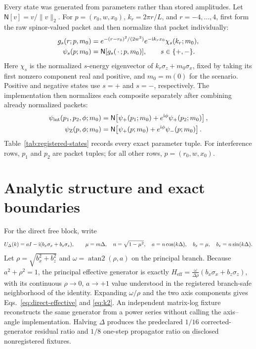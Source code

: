 Every state was generated from parameters rather than stored amplitudes.  Let
$\mathsf N[v]=v/\lVert v\rVert_2$.  For $p=(r_0,w,x_0)$,
$k_r=2\pi r/L$, and $r=-4,\ldots,4$, first form the raw spinor-valued packet
and then normalize that packet individually:
\begin{align}
 g_s(r;p,m_0)
   &=e^{-(r-r_0)^2/(2w^2)}e^{-\mathrm{i} k_rx_0}\chi_s(k_r;m_0),\\
 \psi_s(p;m_0)&=\mathsf N[g_s(\,\cdot\,;p,m_0)],
 \qquad s\in\{+,-\}.
 \label{eq:registered-packet}
\end{align}
Here $\chi_s$ is the normalized $s$-energy eigenvector of
$k_r\sigma_z+m_0\sigma_x$, fixed by taking its first nonzero component real
and positive, and $m_0=m(0)$ for the scenario.  Positive and negative states
use $s=+$ and $s=-$, respectively.  The implementation then normalizes each
composite separately after combining already normalized packets:
\begin{align}
 \psi_{\mathrm{int}}(p_1,p_2,\phi;m_0)
   &=\mathsf N\!\left[\psi_+(p_1;m_0)+e^{\mathrm{i}\phi}\psi_+(p_2;m_0)\right],\\
 \psi_{\mathrm Z}(p,\phi;m_0)
   &=\mathsf N\!\left[\psi_+(p;m_0)+e^{\mathrm{i}\phi}\psi_-(p;m_0)\right].
 \label{eq:registered-composite-states}
\end{align}
Table~\ref{tab:registered-states} records every exact parameter tuple.  For
interference rows, $p_1$ and $p_2$ are packet tuples; for all other rows,
$p=(r_0,w,x_0)$.

\begin{table}[htbp]
  \centering
  \caption{Exact frozen formula parameters for all state witnesses.}
  \label{tab:registered-states}
  \scriptsize
  \setlength{\tabcolsep}{3pt}
  
\end{table}

\section{Analytic structure and exact boundaries}

For the direct free block, write
\begin{equation}
 U_\Delta(k)=aI-\mathrm{i}(b_x\sigma_x+b_z\sigma_z),\qquad
 \mu=m\Delta,\quad n=\sqrt{1-\mu^2},\quad
 a=n\cos(k\Delta),\quad b_x=\mu,\quad b_z=n\sin(k\Delta).
\end{equation}
Let $\rho=\sqrt{b_x^2+b_z^2}$ and
$\omega=\operatorname{atan2}(\rho,a)$ on the principal branch.  Because
$a^2+\rho^2=1$, the principal effective generator is exactly
$H_{\mathrm{eff}}=\frac{\omega}{\Delta\rho}
(b_x\sigma_x+b_z\sigma_z)$, with its continuous $\rho\to0$, $a\to+1$ value
understood in the registered branch-safe neighborhood of the identity.
Expanding $\omega/\rho$ and the two
axis components gives Eqs.~\eqref{eq:direct-effective} and \eqref{eq:k2}.  An independent matrix-log
fixture reconstructs the same generator from a power series without calling
the axis--angle implementation.  Halving $\Delta$ produces the predeclared
$1/16$ corrected-generator residual ratio and $1/8$ one-step propagator ratio
on disclosed nonregistered fixtures.

